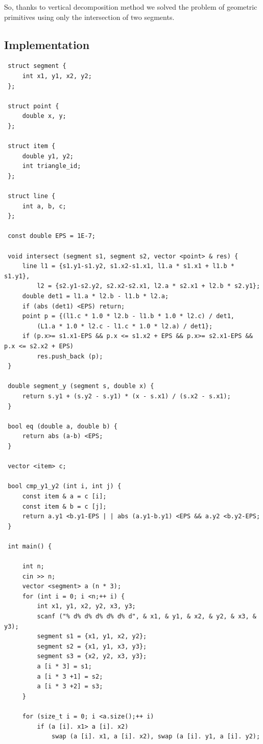 So, thanks to vertical decomposition method we solved the problem of geometric primitives using only the intersection of two segments.

\subsection{ Implementation }
\begin{verbatim}
 struct segment {
     int x1, y1, x2, y2;
 };

 struct point {
     double x, y;
 };

 struct item {
     double y1, y2;
     int triangle_id;
 };

 struct line {
     int a, b, c;
 };

 const double EPS = 1E-7;

 void intersect (segment s1, segment s2, vector <point> & res) {
     line l1 = {s1.y1-s1.y2, s1.x2-s1.x1, l1.a * s1.x1 + l1.b * s1.y1},
         l2 = {s2.y1-s2.y2, s2.x2-s2.x1, l2.a * s2.x1 + l2.b * s2.y1};
     double det1 = l1.a * l2.b - l1.b * l2.a;
     if (abs (det1) <EPS) return;
     point p = {(l1.c * 1.0 * l2.b - l1.b * 1.0 * l2.c) / det1,
         (L1.a * 1.0 * l2.c - l1.c * 1.0 * l2.a) / det1};
     if (p.x>= s1.x1-EPS && p.x <= s1.x2 + EPS && p.x>= s2.x1-EPS && p.x <= s2.x2 + EPS)
         res.push_back (p);
 }

 double segment_y (segment s, double x) {
     return s.y1 + (s.y2 - s.y1) * (x - s.x1) / (s.x2 - s.x1);
 }

 bool eq (double a, double b) {
     return abs (a-b) <EPS;
 }

 vector <item> c;

 bool cmp_y1_y2 (int i, int j) {
     const item & a = c [i];
     const item & b = c [j];
     return a.y1 <b.y1-EPS | | abs (a.y1-b.y1) <EPS && a.y2 <b.y2-EPS;
 }

 int main() {

     int n;
     cin >> n;
     vector <segment> a (n * 3);
     for (int i = 0; i <n;++ i) {
         int x1, y1, x2, y2, x3, y3;
         scanf ("% d% d% d% d% d% d", & x1, & y1, & x2, & y2, & x3, & y3);
         segment s1 = {x1, y1, x2, y2};
         segment s2 = {x1, y1, x3, y3};
         segment s3 = {x2, y2, x3, y3};
         a [i * 3] = s1;
         a [i * 3 +1] = s2;
         a [i * 3 +2] = s3;
     }

     for (size_t i = 0; i <a.size();++ i)
         if (a [i]. x1> a [i]. x2)
             swap (a [i]. x1, a [i]. x2), swap (a [i]. y1, a [i]. y2);


\end{verbatim}
